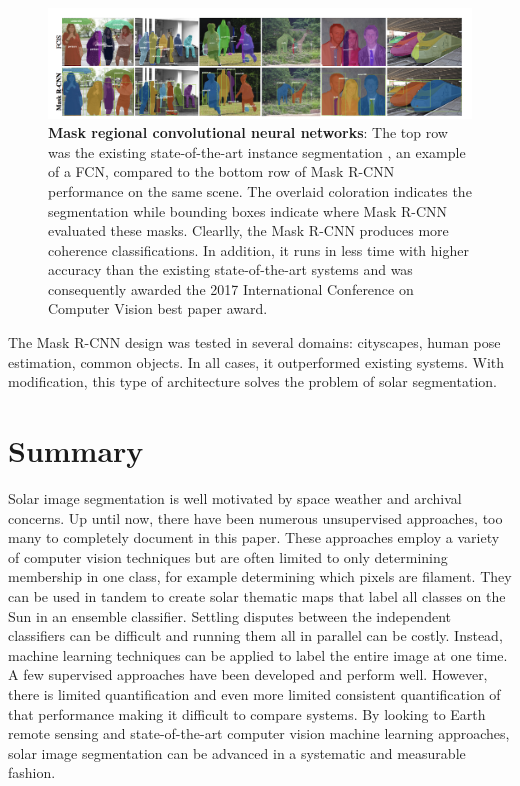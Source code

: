\documentclass[twoside]{report}
\begin{document}
\begin{figure}[ht]
  \begin{center}
    \includegraphics[scale=0.5]{mrcnn.png}
    \caption{{\bf Mask regional convolutional neural networks}: The top row was the existing state-of-the-art instance segmentation \cite{li2016fully}, an example of a FCN, compared to the bottom row of Mask R-CNN performance on the same scene. The overlaid coloration indicates the segmentation while bounding boxes indicate where Mask R-CNN evaluated these masks. Clearlly, the Mask R-CNN produces more coherence classifications. In addition, it runs in less time with higher accuracy than the existing state-of-the-art systems and was consequently awarded the 2017 International Conference on Computer Vision best paper award.}
    \label{fig:mrcnn}
 \end{center}
\end{figure}

The Mask R-CNN design was tested in several domains: cityscapes, human pose estimation, common objects. In all cases, it outperformed existing systems. With modification, this type of architecture solves the problem of solar segmentation. 

\section{Summary}
Solar image segmentation is well motivated by space weather and archival concerns. Up until now, there have been numerous unsupervised approaches, too many to completely document in this paper. These approaches employ a variety of computer vision techniques but are often limited to only determining membership in one class, for example determining which pixels are filament. They can be used in tandem to create solar thematic maps that label all classes on the Sun in an ensemble classifier. Settling disputes between the independent classifiers can be difficult and running them all in parallel can be costly. Instead, machine learning techniques can be applied to label the entire image at one time. A few supervised approaches have been developed and perform well. However, there is limited quantification and even more limited consistent quantification of that performance making it difficult to compare systems. By looking to Earth remote sensing and state-of-the-art computer vision machine learning approaches, solar image segmentation can be advanced in a systematic and measurable fashion. 
\end{document}
